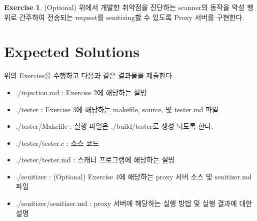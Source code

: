 \documentclass[a4paper, 11pt]{article}
\theoremstyle{definition}
\newtheorem{exercise}{Exercise}
\begin{document}
\begin{exercise}

(Optional) 위에서 개발한 취약점을 진단하는 scanner의 동작을 악성 행위로 간주하여 전송되는 request를 senitizing할 수 있도록 Proxy 서버를 구현한다.

\end{exercise}

\section{Expected Solutions}

위의 Exercise를 수행하고 다음과 같은 결과물을 제출한다. 

\begin{itemize}
	\item ./injection.md : Exercise 2에 해당하는 설명 

	\item ./tester : Exercise 3에 해당하는 makefile, source, 및 tester.md 파일 
	\item ./tester/Makefile : 실행 파일은 ./build/tester로 생성 되도록 한다. 
	\item ./tester/tester.c :  소스 코드 
	\item ./tester/tester.md  : 스캐너 프로그램에 해당하는 설명 

	\item ./senitizer : (Optional) Exercise 4에 해당하는 proxy 서버 소스 및 senitizer.md 파일 
	\item ./senitizer/senitizer.md : proxy 서버에 해당하는 실행 방법 및 실행 결과에 대한 설명 
\end{itemize}



\end{document}
